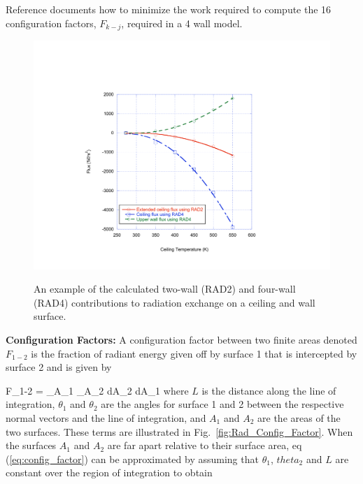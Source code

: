 Reference \cite{Forney_radiation} documents how to minimize the work required to compute the 16 configuration factors, $F_{k-j}$, required in a 4 wall model.

\begin{figure}
\begin{center}
\includegraphics[width=5.0in]{FIGURES/Theory/Radiation_2vs4}\\
\end{center}
\caption{An example of the calculated two-wall (RAD2) and four-wall (RAD4) contributions to radiation exchange on a ceiling and wall surface.}
 \label{fig:Rad_2vs4}
\end{figure}

{\bf Configuration Factors:}  A configuration factor between two finite areas denoted $F_{1-2}$ is the fraction of radiant energy given off by surface 1 that is intercepted by  surface 2 and is given by

\be F_{1-2} =  \int_{A_1} \int_{A_2}  dA_2 dA_1 \label{eq:config_factor} \ee
where $L$ is the distance along the line of integration,  $\theta_1$ and $\theta_2$ are the angles for surface 1 and 2 between the respective normal vectors and the line of integration, and $A_1$ and $A_2$ are the areas of the two surfaces.  These terms are illustrated in Fig.~\ref{fig:Rad_Config_Factor}.  When the surfaces $A_1$ and $A_2$ are far apart relative to their surface area, eq (\ref{eq:config_factor}) can be approximated by assuming that $\theta_1$, $theta_2$ and $L$ are constant over the region of integration to obtain

